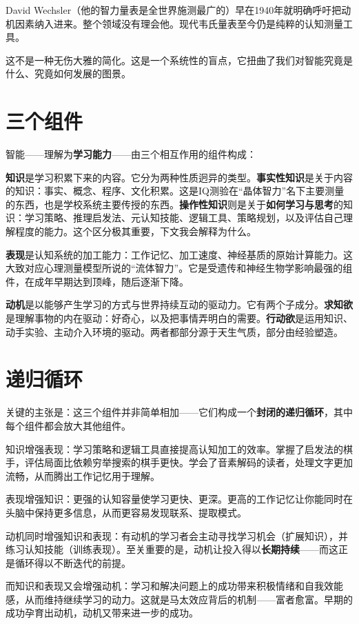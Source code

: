 \documentclass[11pt, twoside, openright]{book}
\begin{document}
David Wechsler（他的智力量表是全世界施测最广的）早在1940年就明确呼吁把动机因素纳入进来。整个领域没有理会他。现代韦氏量表至今仍是纯粹的认知测量工具。

这不是一种无伤大雅的简化。这是一个系统性的盲点，它扭曲了我们对智能究竟是什么、究竟如何发展的图景。

\section*{三个组件}

智能------理解为\textbf{学习能力}------由三个相互作用的组件构成：

\textbf{知识}是学习积累下来的内容。它分为两种性质迥异的类型。\textbf{事实性知识}是关于内容的知识：事实、概念、程序、文化积累。这是IQ测验在“晶体智力”名下主要测量的东西，也是学校系统主要传授的东西。\textbf{操作性知识}则是关于\textbf{如何学习与思考}的知识：学习策略、推理启发法、元认知技能、逻辑工具、策略规划，以及评估自己理解程度的能力。这个区分极其重要，下文我会解释为什么。

\textbf{表现}是认知系统的加工能力：工作记忆、加工速度、神经基质的原始计算能力。这大致对应心理测量模型所说的“流体智力”。它是受遗传和神经生物学影响最强的组件，在成年早期达到顶峰，随后逐渐下降。

\textbf{动机}是以能够产生学习的方式与世界持续互动的驱动力。它有两个子成分。\textbf{求知欲}是理解事物的内在驱动：好奇心，以及把事情弄明白的需要。\textbf{行动欲}是运用知识、动手实验、主动介入环境的驱动。两者都部分源于天生气质，部分由经验塑造。

\section*{递归循环}

关键的主张是：这三个组件并非简单相加------它们构成一个\textbf{封闭的递归循环}，其中每个组件都会放大其他组件。

知识增强表现：学习策略和逻辑工具直接提高认知加工的效率。掌握了启发法的棋手，评估局面比依赖穷举搜索的棋手更快。学会了音素解码的读者，处理文字更加流畅，从而腾出工作记忆用于理解。

表现增强知识：更强的认知容量使学习更快、更深。更高的工作记忆让你能同时在头脑中保持更多信息，从而更容易发现联系、提取模式。

动机同时增强知识和表现：有动机的学习者会主动寻找学习机会（扩展知识），并练习认知技能（训练表现）。至关重要的是，动机让投入得以\textbf{长期持续}------而这正是循环得以不断迭代的前提。

而知识和表现又会增强动机：学习和解决问题上的成功带来积极情绪和自我效能感，从而维持继续学习的动力。这就是马太效应背后的机制------富者愈富。早期的成功孕育出动机，动机又带来进一步的成功。
\end{document}
